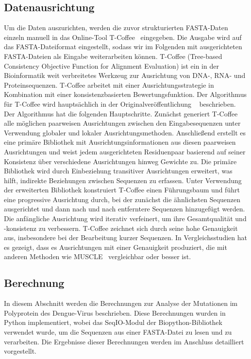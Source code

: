 \documentclass[german,version-2022-01]{uzl-thesis}
\begin{document}
\subsection{Datenausrichtung}
Um die Daten auszurichten, werden die zuvor strukturierten FASTA-Daten einzeln manuell in das Online-Tool T-Coffee~\cite{tcoffee} eingegeben. Die Ausgabe wird auf das FASTA-Dateiformat eingestellt, sodass wir im Folgenden mit ausgerichteten FASTA-Dateien als Eingabe weiterarbeiten k\"onnen. T-Coffee (Tree-based Consistency Objective Function for Alignment Evaluation) ist ein in der Bioinformatik weit verbreitetes Werkzeug zur Ausrichtung von DNA-, RNA- und Proteinsequenzen. T-Coffee arbeitet mit einer Ausrichtungsstrategie in Kombination mit einer konsistenzbasierten Bewertungsfunktion. Der Algorithmus f\"ur T-Coffee wird haupts\"achlich in der Originalver\"offentlichung ~\cite{poirot_tcoffeeigs_2003} beschrieben. Der Algorithmus hat die folgenden Hauptschritte. Zun\"achst generiert T-Coffee alle m\"oglichen paarweisen Ausrichtungen zwischen den Eingabesequenzen unter Verwendung globaler und lokaler Ausrichtungsmethoden. Anschlie\ss{}end erstellt es eine prim\"are Bibliothek mit Ausrichtungsinformationen aus diesen paarweisen Ausrichtungen und weist jedem ausgerichteten Residuenpaar basierend auf seiner Konsistenz \"uber verschiedene Ausrichtungen hinweg Gewichte zu. Die prim\"are Bibliothek wird durch Einbeziehung transitiver Ausrichtungen erweitert, was hilft, indirekte Beziehungen zwischen Sequenzen zu erfassen. Unter Verwendung der erweiterten Bibliothek konstruiert T-Coffee einen F\"uhrungsbaum und f\"uhrt eine progressive Ausrichtung durch, bei der zun\"achst die \"ahnlichsten Sequenzen ausgerichtet und dann nach und nach entferntere Sequenzen hinzugef\"ugt werden. Die anf\"angliche Ausrichtung wird iterativ verfeinert, um ihre Gesamtqualit\"at und -konsistenz zu verbessern. T-Coffee zeichnet sich durch seine hohe Genauigkeit aus, insbesondere bei der Bearbeitung kurzer Sequenzen. In Vergleichsstudien hat es gezeigt, dass es Ausrichtungen mit einer Genauigkeit produziert, die mit anderen Methoden wie MUSCLE~\cite{Edgar2004MUSCLEL} vergleichbar oder besser ist.

\subsection{Berechnung}
In diesem Abschnitt werden die Berechnungen zur Analyse der Mutationen im Polyprotein des Dengue-Virus beschrieben. Diese Berechnungen wurden in Python implementiert, wobei das SeqIO-Modul der Biopython-Bibliothek verwendet wurde, um die Sequenzen aus einer FASTA-Datei zu lesen und zu verarbeiten. Die Ergebnisse dieser Berechnungen werden im Anschluss detailliert vorgestellt.
\end{document}
